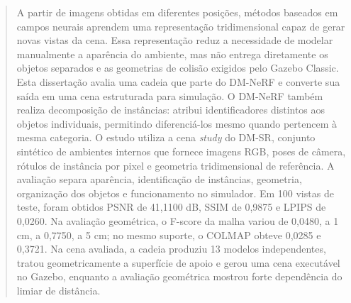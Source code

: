 \begin{abstract}
A partir de imagens obtidas em diferentes posições, métodos baseados em campos neurais aprendem uma representação tridimensional capaz de gerar novas vistas da cena. Essa representação reduz a necessidade de modelar manualmente a aparência do ambiente, mas não entrega diretamente os objetos separados e as geometrias de colisão exigidos pelo Gazebo Classic. Esta dissertação avalia uma cadeia que parte do DM-NeRF e converte sua saída em uma cena estruturada para simulação. O DM-NeRF também realiza decomposição de instâncias: atribui identificadores distintos aos objetos individuais, permitindo diferenciá-los mesmo quando pertencem à mesma categoria. O estudo utiliza a cena \textit{study} do DM-SR, conjunto sintético de ambientes internos que fornece imagens RGB, poses de câmera, rótulos de instância por pixel e geometria tridimensional de referência. A avaliação separa aparência, identificação de instâncias, geometria, organização dos objetos e funcionamento no simulador. Em 100 vistas de teste, foram obtidos PSNR de 41,1100 dB, SSIM de 0,9875 e LPIPS de 0,0260. Na avaliação geométrica, o F-score da malha variou de 0,0480, a 1 cm, a 0,7750, a 5 cm; no mesmo suporte, o COLMAP obteve 0,0285 e 0,3721. Na cena avaliada, a cadeia produziu 13 modelos independentes, tratou geometricamente a superfície de apoio e gerou uma cena executável no Gazebo, enquanto a avaliação geométrica mostrou forte dependência do limiar de distância.
\end{abstract}
